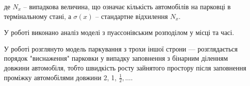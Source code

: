де $N_{x}$ -- випадкова величина, що означає кількість автомобілів на парковці в термінальному стані, а $\sigma(x)$ -- стандартне відхилення $N_{x}$.

У роботі \cite{coffman1998parking} виконано аналіз моделі з пуассонівським розподілом у місці та часі.

У роботі \cite{exhaustion2017mackey} розглянуто модель паркування з трохи іншої строни --- розглядається порядок "виснаження" парковки у випадку заповнення з бінарним діленням довжини автомобіля, тобто швидкість росту зайнятого простору після заповнення проміжку автомобілями довжини 2, 1, $\frac{1}{2}, \dots$.



